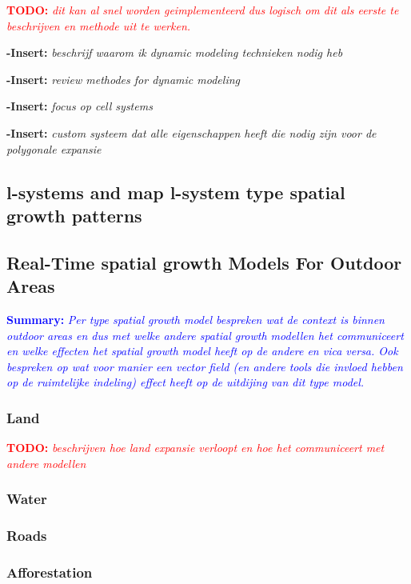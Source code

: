 \documentclass{article}
\newcommand{\todo}[1]{\textcolor{red}{\textbf{TODO: }\it{#1}}}
\newcommand{\inhoud}[1]{\textcolor{blue}{\textbf{Summary: }\it{#1}}}
\newcommand{\voegtoe}[1]{\textcolor{MyDarkGreen}{\textbf{-Insert: }\it{#1}}\newline}
\begin{document}
\todo{dit kan al snel worden geimplementeerd dus logisch om dit als eerste te beschrijven en methode uit te werken.}

\voegtoe{beschrijf waarom ik dynamic modeling technieken nodig heb}



\voegtoe{review methodes for dynamic modeling}


\voegtoe{focus op cell systems}


\voegtoe{custom systeem dat alle eigenschappen heeft die nodig zijn voor de polygonale expansie}

\cite{compgeom}
\cite{vertexsystems}


\subsection{l-systems and map l-system type spatial growth patterns}

\cite{lcreport}


\subsection{Real-Time spatial growth Models For Outdoor Areas}
\inhoud{Per type spatial growth model bespreken wat de context is binnen outdoor areas en dus met 
welke andere spatial growth modellen het communiceert en welke effecten het spatial growth model heeft 
op de andere en vica versa. Ook bespreken op wat voor manier een vector field (en andere tools 
die invloed hebben op de ruimtelijke indeling)  effect heeft op de uitdijing van dit type model.   
}

\subsubsection{Land} 
\todo{beschrijven hoe land expansie verloopt en hoe het communiceert met andere modellen}


\subsubsection{Water} 

\subsubsection{Roads}

\subsubsection{Afforestation} 
\end{document}
